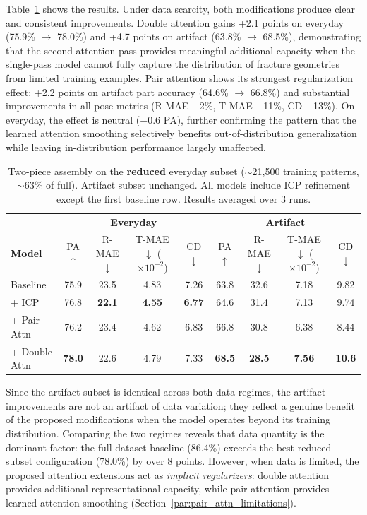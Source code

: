 Table~\ref{tab:two_piece_incomplete} shows the results. Under data scarcity, both modifications produce clear and consistent improvements. Double attention gains +2.1 points on everyday (75.9\% $\to$ 78.0\%) and +4.7 points on artifact (63.8\% $\to$ 68.5\%), demonstrating that the second attention pass provides meaningful additional capacity when the single-pass model cannot fully capture the distribution of fracture geometries from limited training examples. Pair attention shows its strongest regularization effect: +2.2 points on artifact part accuracy (64.6\% $\to$ 66.8\%) and substantial improvements in all pose metrics (R-MAE $-$2\%, T-MAE $-$11\%, CD $-$13\%). On everyday, the effect is neutral ($-$0.6 PA), further confirming the pattern that the learned attention smoothing selectively benefits out-of-distribution generalization while leaving in-distribution performance largely unaffected.

\begin{table}[H]
\centering
\caption{Two-piece assembly on the \textbf{reduced} everyday subset ($\sim$21,500 training patterns, $\sim$63\% of full). Artifact subset unchanged. All models include ICP refinement except the first baseline row. Results averaged over 3 runs.}
\label{tab:two_piece_incomplete}
\begin{tabular}{l|cccc|cccc}
\toprule
& \multicolumn{4}{c|}{\textbf{Everyday}} & \multicolumn{4}{c}{\textbf{Artifact}} \\
\textbf{Model} & PA$\uparrow$ & R-MAE$\downarrow$ & \shortstack{T-MAE$\downarrow$\\($\times 10^{-2}$)} & CD$\downarrow$
               & PA$\uparrow$ & R-MAE$\downarrow$ & \shortstack{T-MAE$\downarrow$\\($\times 10^{-2}$)} & CD$\downarrow$ \\
\midrule
Baseline & 75.9 & 23.5 & 4.83 & 7.26 & 63.8 & 32.6 & 7.18 & 9.82 \\
+ ICP & 76.8 & \textbf{22.1} & \textbf{4.55} & \textbf{6.77} & 64.6 & 31.4 & 7.13 & 9.74 \\
+ Pair Attn & 76.2 & 23.4 & 4.62 & 6.83 & 66.8 & 30.8 & 6.38 & 8.44 \\
+ Double Attn & \textbf{78.0} & 22.6 & 4.79 & 7.33 & \textbf{68.5} & \textbf{28.5} & \textbf{7.56} & \textbf{10.6} \\
\bottomrule
\end{tabular}
\end{table}

Since the artifact subset is identical across both data regimes, the artifact improvements are not an artifact of data variation; they reflect a genuine benefit of the proposed modifications when the model operates beyond its training distribution. Comparing the two regimes reveals that data quantity is the dominant factor: the full-dataset baseline (86.4\%) exceeds the best reduced-subset configuration (78.0\%) by over 8 points. However, when data is limited, the proposed attention extensions act as \textit{implicit regularizers}: double attention provides additional representational capacity, while pair attention provides learned attention smoothing (Section~\ref{par:pair_attn_limitations}).

